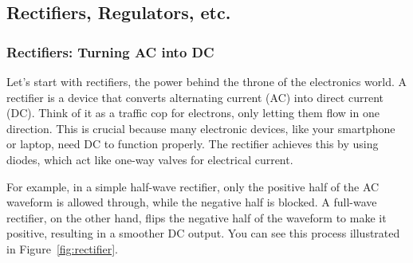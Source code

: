 \subsection{Rectifiers, Regulators, etc.}
\label{subsec:rect-reg}

\subsubsection*{Rectifiers: Turning AC into DC}
Let's start with rectifiers, the power behind the throne of the electronics world. A rectifier is a device that converts alternating current (AC) into direct current (DC). Think of it as a traffic cop for electrons, only letting them flow in one direction. This is crucial because many electronic devices, like your smartphone or laptop, need DC to function properly. The rectifier achieves this by using diodes, which act like one-way valves for electrical current. 

For example, in a simple half-wave rectifier, only the positive half of the AC waveform is allowed through, while the negative half is blocked. A full-wave rectifier, on the other hand, flips the negative half of the waveform to make it positive, resulting in a smoother DC output. You can see this process illustrated in Figure~\ref{fig:rectifier}.

